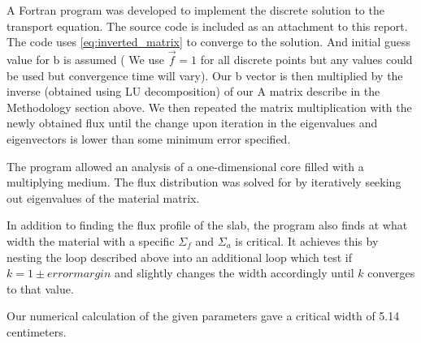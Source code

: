 \documentclass[../main.tex]{subfiles}
\begin{document}
A Fortran program was developed to implement the discrete solution to the transport equation. The source code is included as an attachment to this report. The code uses \eqref{eq:inverted_matrix} to converge to the solution. And initial guess value for b is assumed ( We use $\overrightarrow{f}=1$ for all discrete points but any values could be used but convergence time will vary). Our b vector is then multiplied by the inverse (obtained using LU decomposition) of our A matrix describe in the Methodology section above. We then repeated the matrix multiplication with the newly obtained flux until the change upon iteration in the eigenvalues and eigenvectors is lower than some minimum error specified.

The program allowed an analysis of a one-dimensional core filled with a multiplying medium. The flux distribution was solved for by iteratively seeking out eigenvalues of the material matrix. 

In addition to finding the flux profile of the slab, the program also finds at what width the material with a specific $\Sigma_f$ and $\Sigma_a$ is critical. It achieves this by nesting the loop described above into an additional loop which test if $k = 1 \pm error margin$  and slightly changes the width accordingly until $k$ converges to that value. 

Our numerical calculation of the given parameters gave a critical width of 5.14 centimeters. 
\end{document}

